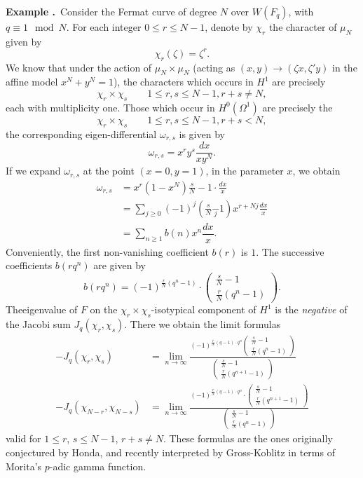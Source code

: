 \smallskip
\noindent
{\bf Example .\label{art6-exam6.3}}~Consider the Fermat curve of degree $N$ over $W(F_{q})$, with $q\equiv 1\mod N$. For each integer $0\leq r\leq N-1$, denote by $\chi_{r}$ the character of $\mu_{N}$ given by
$$
\chi_{r}(\zeta)=\zeta^{r}.
$$
We know that under the action of $\mu_{N}\times \mu_{N}$ (acting as $(x,y)\to (\zeta x,\zeta' y)$ in the affine model $x^{N}+y^{N}=1$), the characters which occurs in $H^{1}$ are precisely
$$
\chi_{r}\times \chi_{s}\qquad 1\leq r, s\leq N-1, r+s\neq N,
$$
each with multiplicity one. Those which occur in $H^{0}(\Omega^{1})$ are precisely the
$$
\chi_{r}\times \chi_{s}\qquad 1\leq r,s\leq N-1, r+s<N,
$$
the corresponding eigen-differential $\omega_{r,s}$ is given by
$$
\omega_{r,s}=x^{r}y^{s}\frac{dx}{xy^{N}}.
$$
If we expand $\omega_{r,s}$ at the point $(x=0,y=1)$, in the parameter $x$, we obtain 
\begin{align*}
\omega_{r,s} &= x^{r}(1-x^{N})\frac{s}{N}-1\cdot \frac{dx}{x}\\[3pt]
&= \sum\limits_{j\geq 0}(-1)^{j}\left(\frac{s}{N}{\displaystyle{\mathop{-}\limits_{j}}}1\right)x^{r+Nj}\frac{dx}{x}\\[3pt]
&= \sum\limits_{n\geq 1}b(n)x^{n}\dfrac{dx}{x}.
\end{align*}
Conveniently, the first non-vanishing coefficient $b(r)$ is $1$. The successive coefficients $b(rq^{n})$ are given by
$$
b(rq^{n})=(-1)^{\frac{r}{N}(q^{n}-1)}\cdot 
\left(\begin{matrix} 
\frac{s}{N}-1\\[4pt]
\frac{r}{N}(q^{n}-1)
\end{matrix}
\right).
$$
The\pageoriginale eigenvalue of $F$ on the $\chi_{r}\times \chi_{s}$-isotypical component of $H^{1}$ is the {\em negative} of the Jacobi sum $J_{q}(\chi_{r},\chi_{s})$. There we obtain the limit formulas
\begin{align*}
-J_{q}(\chi_{r},\chi_{s}) &= \lim\limits_{n\to \infty}
\frac{
(-1)^{\frac{r}{N}(q-1)\cdot q^{n}}
\left(\begin{matrix}
\frac{s}{N}-1\\[4pt]
\frac{r}{N}(q^{n}-1)
\end{matrix}\right)}
{\left(\begin{matrix}
\frac{s}{N}-1\\[4pt]
\frac{r}{N}(q^{n+1}-1)
\end{matrix}\right)}\\[10pt]
-J_{q}(\chi_{N-r},\chi_{N-s}) &= 
\lim\limits_{n\to \infty}
\frac{(-1)^{\frac{r}{N}(q-1)\cdot q^{n}}\cdot 
\left(
\begin{matrix}
\frac{s}{N}-1\\[4pt]
\frac{r}{N}(q^{n+1}-1)
\end{matrix}
\right)}{
\left(
\begin{matrix}
\frac{s}{N}-1\\[4pt]
\frac{r}{N}(q^{n}-1)
\end{matrix}
\right)}
\end{align*}
valid for $1\leq r$, $s\leq N-1$, $r+s\neq N$. These formulas are the ones originally conjectured by Honda, and recently interpreted by Gross-Koblitz \cite{art6-key14} in terms of Morita's $p$-adic gamma function.

